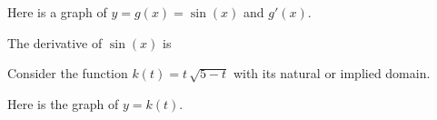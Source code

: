 \documentclass{ximera}
\begin{document}
\begin{example}



Here is a graph of $y = g(x) = \sin(x)$ and $g'(x)$.






\begin{center}
\end{center}



The derivative of $\sin(x)$ is
\begin{multipleChoice}
\end{multipleChoice}


\end{example}




















































Consider the function $k(t) = t \, \sqrt{5-t}$ with its natural or implied domain.

Here is the graph of $y = k(t)$.
\end{document}
